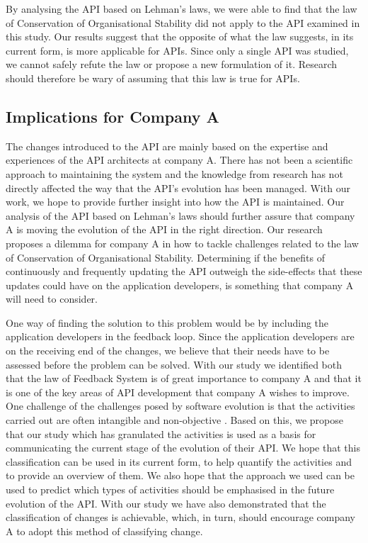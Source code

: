 \documentclass{sig-alternate}
\begin{document}
By analysing the API based on Lehman's laws, we were able to find that the law of Conservation of Organisational Stability did not apply to the API examined in this study. Our results suggest that the opposite of what the law suggests, in its current form, is more applicable for APIs. Since only a single API was studied, we cannot safely refute the law or propose a new formulation of it. Research should therefore be wary of assuming that this law is true for APIs.



\subsection{Implications for Company A}
The changes introduced to the API are mainly based on the expertise and experiences of the API architects at company A. There has not been a scientific approach to maintaining the system and the knowledge from research has not directly affected the way that the API's evolution has been managed. With our work, we hope to provide further insight into how the API is maintained. Our analysis of the API based on Lehman's laws should further assure that company A is moving the evolution of the API in the right direction. Our research proposes a dilemma for company A in how to tackle challenges related to the law of Conservation of Organisational Stability. Determining if the benefits of continuously and frequently updating the API outweigh the side-effects that these updates could have on the application developers, is something that company A will need to consider.

One way of finding the solution to this problem would be by including the application developers in the feedback loop. Since the application developers are on the receiving end of the changes, we believe that their needs have to be assessed before the problem can be solved. With our study we identified both that the law of Feedback System is of great importance to company A and that it is one of the key areas of API development that company A wishes to improve. One challenge of the challenges posed by software evolution is that the activities carried out are often intangible and non-objective \cite{chapin2001types, lientz1980software}. Based on this, we propose that our study which has granulated the activities is used as a basis for communicating the current stage of the evolution of their API. We hope that this classification can be used in its current form, to help quantify the activities and to provide an overview of them. We also hope that the approach we used can be used to predict which types of activities should be emphasised in the future evolution of the API. With our study we have also demonstrated that the classification of changes is achievable, which, in turn, should encourage company A to adopt this method of classifying change.
\end{document}
